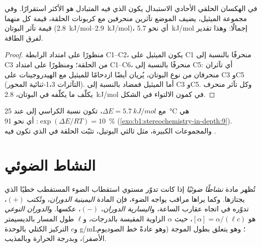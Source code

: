 \begin{proposition}\label{prop:b1:stereochemistry-in-depth:chair-substituent}
في الهكسان الحلقي الأحادي الاستبدال يكون  الذي فيه المتبادل
 هو الأكثر استقرارًا. وفي مجموعة الميثيل، يضيف الموضع 
تآثرين منحرفين مع كربونات الحلقة، قيمة كل منهما قيمة تآثر البوتان
(\qtyrange{2.8}{2.9}{kJ/mol})، أي نحو \qty{5.7}{kJ/mol} إجمالًا: وهذا تقدير
لفرق الطاقة.
\end{proposition}

\begin{proof}
منظورًا على امتداد الرابطة C1--C2، يكون الميثيل  على C1 منحرفًا بالنسبة إلى C3
من الحلقة؛ ومنظورًا على امتداد C1--C6، منحرفًا بالنسبة إلى C5: أي تآثران منحرفان من
نوع البوتان، يُريان أيضًا ازدحامًا للميثيل مع
الهيدروجينات  على C3 وC5 (التآثرات 1،3-ثنائية المحور). أما
الميثيل  فمضاد بالنسبة إلى C3 وC5. وكل تآثر منحرف يكلّف
ما يكلّفه في البوتان، \qty{2.8}{kJ/mol} في كمون الالتواء في
الشكل.
\end{proof}

مع $\Delta E = \qty{5.7}{kJ/mol}$، تكون نسبة الكراسي  إلى 
عند \qty{25}{\celsius} هي $\exp(\Delta E/RT) = 10$: أي نحو
\qty{91}{\percent}  (\cref{exo:b1:stereochemistry-in-depth:9}).
والمجموعات الكبيرة، مثل ثالثي البوتيل، تثبّت الحلقة في  الذي تكون فيه
.

\section{النشاط الضوئي}

\begin{definition}\label{def:b1:stereochemistry-in-depth:optical-activity}
تُظهر مادة \emph{نشاطًا ضوئيًا} إذا كانت
تدوّر مستوي استقطاب الضوء المستقطب خطيًا الذي يجتازها.
وكما يراها مراقب يواجه الضوء، فإن المادة
\emph{اليمينية الدوران}، وتُكتب $(+)$،
تدوّره في اتجاه عقارب الساعة، و\emph{اليسارية الدوران}،
$(-)$، عكسها. و\emph{الدوران النوعي}
هو $[\alpha] = \alpha/(\ell c)$، حيث $\alpha$ الزاوية
المقيسة بالدرجات، و$\ell$ طول المسار بالديسيمتر و$c$ التركيز
الكتلي بالوحدة \unit{g/mL}؛ وهو يتعلق بطول الموجة (وهو عادةً
خط الصوديوم الأصفر)، وبدرجة الحرارة وبالمذيب.
\end{definition}

